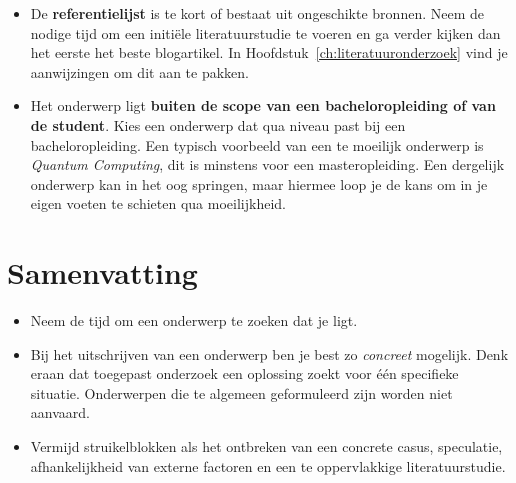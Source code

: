 \begin{itemize}
  \item De \textbf{referentielijst} is te kort of bestaat uit ongeschikte bronnen. Neem de nodige tijd om een initiële literatuurstudie te voeren en ga verder kijken dan het eerste het beste blogartikel. In Hoofdstuk~\ref{ch:literatuuronderzoek} vind je aanwijzingen om dit aan te pakken.

  \item Het onderwerp ligt \textbf{buiten de scope van een bacheloropleiding of van de student}. Kies een onderwerp dat qua niveau past bij een bacheloropleiding. Een typisch voorbeeld van een te moeilijk onderwerp is \textit{Quantum Computing}, dit is minstens voor een masteropleiding. Een dergelijk onderwerp kan in het oog springen, maar hiermee loop je de kans om in je eigen voeten te schieten qua moeilijkheid.
\end{itemize}

\section{Samenvatting}%
\label{sec:onderwerp_samenvatting}

\begin{itemize}
  \item Neem de tijd om een onderwerp te zoeken dat je ligt.
  \item Bij het uitschrijven van een onderwerp ben je best zo \emph{concreet} mogelijk. Denk eraan dat toegepast onderzoek een oplossing zoekt voor één specifieke situatie. Onderwerpen die te algemeen geformuleerd zijn worden niet aanvaard.
  \item Vermijd struikelblokken als het ontbreken van een concrete casus, speculatie, afhankelijkheid van externe factoren en een te oppervlakkige literatuurstudie.
\end{itemize}
